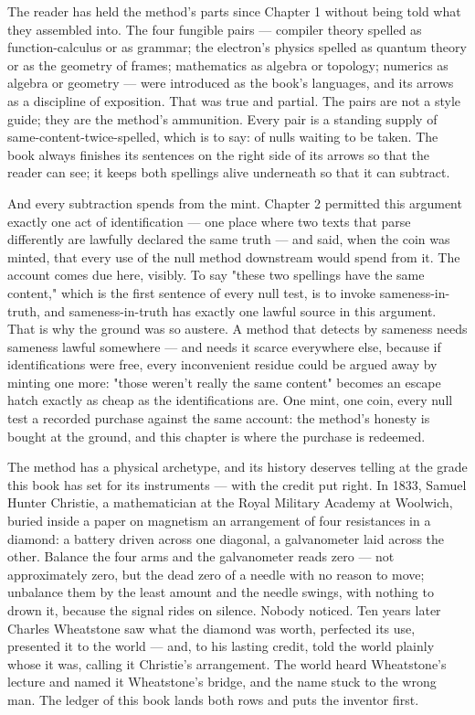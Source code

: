 The reader has held the method's parts since Chapter 1 without being told what they
assembled into. The four fungible pairs --- compiler theory spelled as
function-calculus or as grammar; the electron's physics spelled as quantum theory or
as the geometry of frames; mathematics as algebra or topology; numerics as algebra
or geometry --- were introduced as the book's languages, and its arrows as a
discipline of exposition. That was true and partial. The pairs are not a style
guide; they are the method's ammunition. Every pair is a standing supply of
same-content-twice-spelled, which is to say: of nulls waiting to be taken. The book
always finishes its sentences on the right side of its arrows so that the reader
can see; it keeps both spellings alive underneath so that it can subtract.

And every subtraction spends from the mint. Chapter 2 permitted this argument
exactly one act of identification --- one place where two texts that parse
differently are lawfully declared the same truth --- and said, when the coin was
minted, that every use of the null method downstream would spend from it. The
account comes due here, visibly. To say "these two spellings have the same
content," which is the first sentence of every null test, is to invoke
sameness-in-truth, and sameness-in-truth has exactly one lawful source in this
argument. That is why the ground was so austere. A method that detects by sameness
needs sameness lawful somewhere --- and needs it scarce everywhere else, because if
identifications were free, every inconvenient residue could be argued away by
minting one more: "those weren't really the same content" becomes an escape hatch
exactly as cheap as the identifications are. One mint, one coin, every null test a
recorded purchase against the same account: the method's honesty is bought at the
ground, and this chapter is where the purchase is redeemed.

The method has a physical archetype, and its history deserves telling at the grade
this book has set for its instruments --- with the credit put right. In 1833,
Samuel Hunter Christie, a mathematician at the Royal Military Academy at Woolwich,
buried inside a paper on magnetism an arrangement of four resistances in a diamond:
a battery driven across one diagonal, a galvanometer laid across the other.
Balance the four arms and the galvanometer reads zero --- not approximately zero,
but the dead zero of a needle with no reason to move; unbalance them by the least
amount and the needle swings, with nothing to drown it, because the signal rides
on silence. Nobody noticed. Ten years later Charles Wheatstone saw what the
diamond was worth, perfected its use, presented it to the world --- and, to his
lasting credit, told the world plainly whose it was, calling it Christie's
arrangement. The world heard Wheatstone's lecture and named it Wheatstone's
bridge, and the name stuck to the wrong man. The ledger of this book lands both
rows and puts the inventor first.

